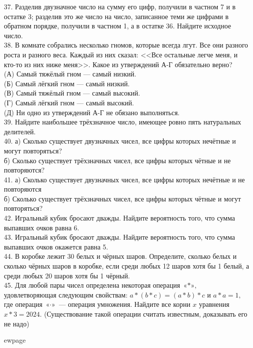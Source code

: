 37. Разделив двузначное число на сумму его цифр, получили в частном 7 и в остатке 3; разделив это же число на число, записанное теми же цифрами в обратном порядке, получили в частном 1, а в остатке 36. Найдите исходное число.\\
38. В комнате собрались несколько гномов, которые всегда лгут. Все они разного роста и разного веса. Каждый из них сказал: <<Все остальные легче меня, и кто-то из них ниже меня>>. Какое из утверждений А-Г обязательно верно?\\
(А) Самый тяжёлый гном --- самый низкий.\\
(Б) Самый лёгкий гном --- самый низкий.\\
(В) Самый тяжёлый гном --- самый высокий.\\
(Г) Самый лёгкий гном --- самый высокий.\\
(Д) Ни одно из утверждений А-Г не обязано выполняться.\\
39. Найдите наибольшее трёхзначное число, имеющее ровно пять натуральных делителей.\\
40. а) Сколько существует двузначных чисел, все цифры которых нечётные и могут повторяться?\\
б) Сколько существует трёхзначных чисел, все цифры которых чётные и не повторяются?\\
41. а) Сколько существует двузначных чисел, все цифры которых нечётные и не повторяются\\
б) Сколько существует трёхзначных чисел, все цифры которых чётные и могут повторяться?\\
42. Игральный кубик бросают дважды. Найдите вероятность того, что сумма выпавших очков равна 6.\\
43. Игральный кубик бросают дважды. Найдите вероятность того, что сумма выпавших очков окажется равна 5.\\
44. В коробке лежит 30 белых и чёрных шаров. Определите, сколько белых и сколько чёрных шаров в коробке, если среди любых 12 шаров хотя бы 1 белый, а среди любых 20 шаров хотя бы 1 чёрный.\\
45. Для любой пары чисел определена некоторая операция $\text{«$\ast$»,}$ удовлетворяющая следующим свойствам:
$a*(b*c)=(a*b)*c$ и $a*a=1,$ где операция $\text{«$\cdot$»}$ --- операция умножения. Найдите все корни $x$ уравнения
$x*3=2024.$ (Существование такой операции считать известным, доказывать его не надо)

ewpage
